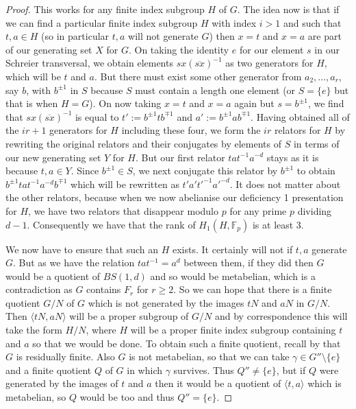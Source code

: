 \documentclass[11pt,reqno]{amsart}
\numberwithin{equation}{section}
\newcommand{\F}{\mathbb{F}}
\theoremstyle{definition}
\theoremstyle{remark}
\begin{document}
\begin{proof}
This works for any finite index subgroup $H$ of $G$.
The idea now is that if we can find a particular finite index
subgroup $H$ with index $i>1$ and such that
$t,a\in H$ (so in particular $t,a$ will not generate
$G$) then
$x=t$ and $x=a$ are part of our generating set $X$ for $G$. On taking
the identity
$e$ for our element $s$ in our Schreier transversal, we obtain
elements $sx(\overline{sx})^{-1}$ as two generators for $H$, which will be
$t$ and $a$. But there must exist some other generator from
$a_2,\ldots ,a_r$, say $b$, with $b^{\pm 1}$ in $S$ 
because $S$ must contain a length
one element (or $S=\{e\}$ but that is when $H=G$). On now taking
$x=t$ and $x=a$ again but $s=b^{\pm 1}$, we find that
$sx(\overline{sx})^{-1}$ is equal to $t':=b^{\pm 1}tb^{\mp 1}$ and
$a':=b^{\pm 1} ab^{\mp 1}$.
Having obtained all of the $ir+1$ generators for $H$ including these four, we
form the $ir$ relators for $H$ by rewriting the original relators and their
conjugates by elements of $S$ in terms of our new generating set $Y$
for $H$. But our first relator $tat^{-1}a^{-d}$ stays as it is because
$t,a\in Y$. Since $b^{\pm 1}\in S$,
we next conjugate this relator by $b^{\pm 1}$ to obtain
$b^{\pm 1}tat^{-1}a^{-d}b^{\mp 1}$
which will be rewritten as $t'a't'^{-1}a'^{-d}$. It does not matter about
the other relators, because when we now abelianise our deficiency 1
presentation for $H$, we have two relators that disappear modulo $p$
for any prime $p$ dividing $d-1$. Consequently we have that the rank
of $H_1(H,\F_p)$ is at least 3.

We now have to ensure that such an $H$ exists. It certainly will not
if $t,a$ generate $G$. But as we have the relation $tat^{-1}=a^d$
between them, if they did then $G$ would be a quotient of $BS(1,d)$
and so would be metabelian, which is a contradiction as $G$ contains
$F_r$ for $r\geq 2$. So we can hope that there is a finite quotient $G/N$
of $G$ which is not generated by the images $tN$ and $aN$ in $G/N$. Then
$\langle tN,aN\rangle$ will be a proper subgroup of $G/N$ and by
correspondence this will take the form $H/N$, where
$H$ will be a proper finite index subgroup containing $t$ and $a$ so
that we would be done. To obtain such a finite quotient, recall by
\cite{bs} that $G$ is residually finite. Also $G$ is not metabelian, so
that we can take $\gamma \in G''\setminus \{e\}$ and a finite quotient
$Q$ of $G$ in
which $\gamma$ survives. Thus $Q''\neq \{e\}$, but if $Q$ were generated
by the images of $t$ and $a$ then it would be a quotient of
$\langle t,a\rangle$ which is metabelian, so $Q$ would be too and thus
$Q''=\{e\}$.
\end{proof}
\end{document}

